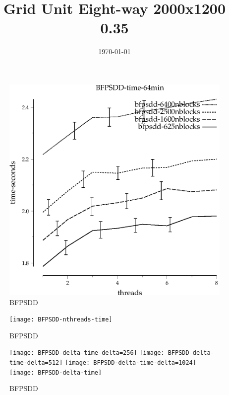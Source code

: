 \documentclass{article}
\title{Grid Unit Eight-way 2000x1200 0.35}
\date{\today}
\begin{document}
\maketitle

\begin{figure}
\begin{center}
\includegraphics{BFPSDD-time-64min}
\end{center}
\caption{BFPSDD}
\end{figure}

\begin{figure}
\begin{center}
\texttt{[image: BFPSDD-nthreads-time]}
\end{center}
\caption{BFPSDD}
\end{figure}

\begin{figure}
\begin{center}
\texttt{[image: BFPSDD-delta-time-delta=256]}
\texttt{[image: BFPSDD-delta-time-delta=512]}
\texttt{[image: BFPSDD-delta-time-delta=1024]}
\texttt{[image: BFPSDD-delta-time]}
\end{center}
\caption{BFPSDD}
\end{figure}

\end{document}
